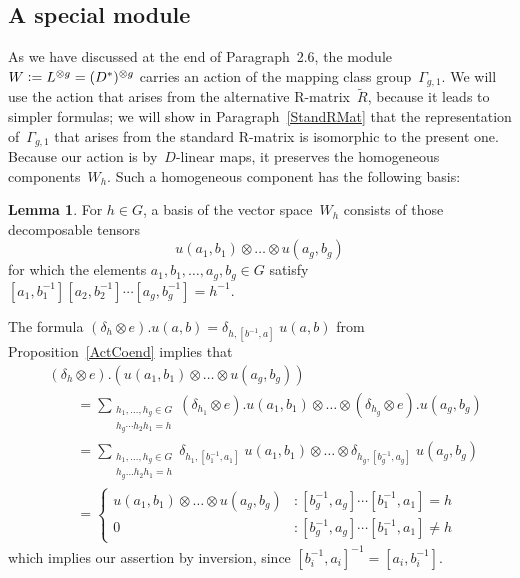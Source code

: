\documentclass[12pt]{article}
\makeatletter
\theoremstyle{definition}
\newtheorem{Lemma}[Satz]{Lemma}
\theoremstyle{break}
\renewenvironment{proof}[1][\proofname]{\par
\vspace{-5pt}%
\pushQED{\qed}%
\normalfont
\topsep0pt \partopsep0pt %
\trivlist
\item[\hskip\labelsep
\bfseries
#1\@addpunct{.}]\ignorespaces
}{%
\popQED\endtrivlist\@endpefalse
\addvspace{6pt plus 6pt} %
}
\renewcommand{\1}{\mathbbm{1}}
\newcommand{\ot}{\mathbin{\otimes}}
\newcommand{\uu}{u}
\newcommand{\deq}{\vcentcolon =}
\makeatother
\begin{document}
\enlargethispage{5mm}
\vspace{4mm}

\subsection{A special module} \label{SpecMod}
As we have discussed at the end of Paragraph~2.6, the module
$W \deq L^{\ot g} = (D^*)^{\ot g}$ carries an action of the mapping class group~$\Gamma_{g,1}$. We will use the action that arises from the alternative R-matrix~$\tilde{R}$, because it leads to simpler formulas; we will show in Paragraph~\ref{StandRMat} that the  representation of~$\Gamma_{g,1}$ that arises from the standard \mbox{R-matrix} is isomorphic to the present one. Because our action is by~$D$-linear maps, it preserves the homogeneous components~$W_h$. Such a homogeneous component has the following basis:
\vspace{1mm}
\begin{Lemma} \label{LemBasis}
For $h \in G$, a basis of the vector space~$W_h$ consists of those decomposable tensors
\[\uu(a_1,b_1) \ot \dots \ot \uu(a_g,b_g)\]
for which the elements
$a_1, b_1, \ldots, a_g, b_g \in G$ satisfy $[a_1, b_1^{-1}] [a_2, b_2^{-1}] \cdots [a_g, b_g^{-1}] = h^{-1}$.
\end{Lemma}
\begin{proof}
The formula
$(\delta_h \ot e).\uu(a,b) = \delta_{h, [b^{-1}, a]} \; \uu(a,b)$
from Proposition~\ref{ActCoend} implies that
\begin{align*}
&(\delta_h \ot e).(\uu(a_1,b_1) \ot \dots \ot \uu(a_g,b_g)) \\
&\qquad =
\sum_{\substack{h_1,\ldots,h_g \in G \\ h_g \cdots h_2 h_1 = h}}
(\delta_{h_1} \ot e).\uu(a_1,b_1)  \ot \dots \ot (\delta_{h_g} \ot e).\uu(a_g,b_g) \\
&\qquad =
\sum_{\substack{h_1,\ldots,h_g \in G \\ h_g \dots h_2 h_1 = h}}
\delta_{h_1, [b_1^{-1}, a_1]} \; \uu(a_1,b_1)  \ot \dots \ot
\delta_{h_g, [b_g^{-1}, a_g]} \; \uu(a_g,b_g) \\
&\qquad =
\begin{cases}
\uu(a_1,b_1) \ot \dots \ot \uu(a_g,b_g) &: [b_g^{-1}, a_g] \cdots [b_1^{-1}, a_1]  = h \\
0 &:  [b_g^{-1}, a_g] \cdots [b_1^{-1}, a_1] \neq h
\end{cases}
\end{align*}
which implies our assertion by inversion, since $[b_i^{-1}, a_i]^{-1} = [a_i, b_i^{-1}]$.
\end{proof}
\end{document}
